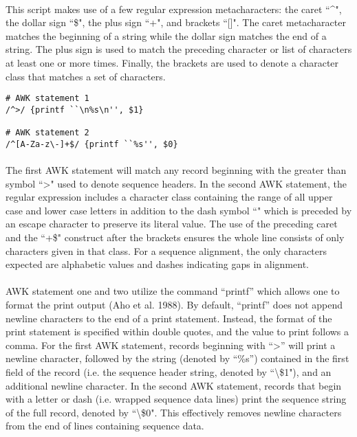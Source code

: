 \vspace*{30pt}

\paragraph{} This script makes use of a few regular expression metacharacters: the caret ``\string^", the dollar sign ``\$", the plus sign ``+", and brackets ``[]".  The caret metacharacter matches the beginning of a string while the dollar sign matches the end of a string.  The plus sign is used to match the preceding character or list of characters at least one or more times.  Finally, the brackets are used to denote a character class that matches a set of characters.

\clearpage

\begin{lstlisting}[caption={\textit{unwrap\_fasta.sh} AWK Print Statements}]
# AWK statement 1
/^>/ {printf ``\n%s\n'', $1}

# AWK statement 2
/^[A-Za-z\-]+$/ {printf ``%s'', $0}
\end{lstlisting}

\vspace*{30pt}

\paragraph{} The first AWK statement will match any record beginning with the greater than symbol ``>" used to denote sequence headers.  In the second AWK statement, the regular expression includes a character class containing the range of all upper case and lower case letters in addition to the dash symbol ``\-" which is preceded by an escape character to preserve its literal value.  The use of the preceding caret and the ``+\$" construct after the brackets ensures the whole line consists of only characters given in that class.  For a sequence alignment, the only characters expected are alphabetic values and dashes indicating gaps in alignment.  

\paragraph{} AWK statement one and two utilize the command ``printf” which allows one to format the print output (Aho et al. 1988).  By default, ``printf” does not append newline characters to the end of a print statement.  Instead, the format of the print statement is specified within double quotes, and the value to print follows a comma.  For the first AWK statement, records beginning with ``>” will print a newline character, followed by the string (denoted by ``\%s”) contained in the first field of the record (i.e. the sequence header string, denoted by ``\textbackslash\$1"), and an additional newline character.  In the second AWK statement, records that begin with a letter or dash (i.e. wrapped sequence data lines) print the sequence string of the full record, denoted by ``\textbackslash\$0".  This effectively removes newline characters from the end of lines containing sequence data. 

